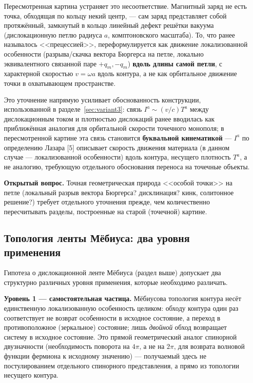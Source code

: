 \documentclass[12pt,a4paper]{article}
\begin{document}
Пересмотренная картина устраняет это несоответствие. Магнитный заряд не
есть точка, обходящая по кольцу некий центр, --- сам заряд представляет
собой протяжённый, замкнутый в кольцо линейный дефект решётки вакуума
(дислокационную петлю радиуса $a$, комптоновского масштаба). То, что
ранее называлось <<прецессией>>, переформулируется как движение
локализованной особенности (разрыва/скачка вектора Бюргерса на петле,
локально эквивалентного связанной паре $+q_m,-q_m$) \textbf{вдоль
длины самой петли}, с характерной скоростью $v=\omega a$ вдоль
контура, а не как орбитальное движение точки в охватывающем
пространстве.

Это уточнение напрямую усиливает обоснованность конструкции,
использованной в разделе~\ref{sec:variant3}: связь $I^a\sim(v/c)T^a$
между дислокационным током и плотностью дислокаций ранее вводилась как
приближённая аналогия для орбитальной скорости точечного монополя; в
пересмотренной картине эта связь становится \textbf{буквальной
кинематикой} --- $I^a$ по определению Лазара [5] описывает скорость
движения материала (в данном случае --- локализованной особенности)
вдоль контура, несущего плотность $T^a$, а не аналогию, требующую
отдельного обоснования переноса на точечные объекты.

\textbf{Открытый вопрос.} Точная геометрическая природа
<<особой точки>> на петле (локальный разрыв вектора Бюргерса?
дисклинация? кинк, солитонное решение?) требует отдельного уточнения
прежде, чем количественно пересчитывать разделы, построенные на старой
(точечной) картине.

\subsection{Топология ленты Мёбиуса: два уровня применения}

Гипотеза о дислокационной ленте Мёбиуса (раздел выше) допускает два
структурно различных уровня применения, которые необходимо различать.

\textbf{Уровень 1 --- самостоятельная частица.} Мёбиусова топология
контура несёт единственную локализованную особенность целиком: обходу
контура один раз соответствует не возврат особенности в исходное
состояние, а переход в противоположное (зеркальное) состояние; лишь
\emph{двойной} обход возвращает систему в исходное состояние. Это прямой
геометрический аналог спинорной двузначности (необходимость поворота на
$4\pi$, а не на $2\pi$, для возврата волновой функции фермиона к
исходному значению) --- получаемый здесь не постулированием отдельного
спинорного представления, а прямо из топологии несущего контура.
\end{document}
